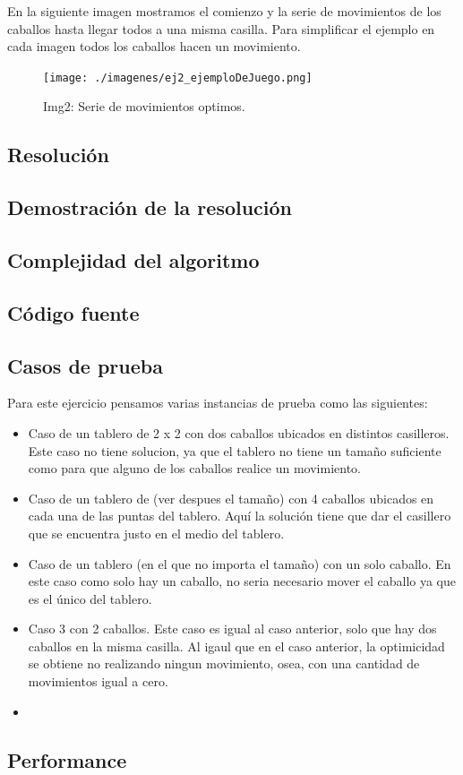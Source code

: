 En la siguiente imagen mostramos el comienzo y la serie de movimientos de los caballos hasta llegar todos a una misma casilla. Para simplificar el ejemplo en cada imagen todos los caballos hacen un movimiento.

\begin{figure}[H]
\begin{center}
\texttt{[image: ./imagenes/ej2\_ejemploDeJuego.png]}
\caption{Img2: Serie de movimientos optimos.}
\end{center}
\end{figure}


\subsection{Resoluci\'on}



\subsection{Demostraci\'on de la resoluci\'on}


\subsection{Complejidad del algoritmo}


\subsection{C\'odigo fuente}


\subsection{Casos de prueba}

Para este ejercicio pensamos varias instancias de prueba como las siguientes:

\begin{itemize}
\item Caso de un tablero de 2 x 2 con dos caballos ubicados en distintos casilleros. Este caso no tiene solucion, ya que el tablero no tiene un tamaño suficiente como para que alguno de los caballos realice un movimiento.
\item Caso de un tablero de (ver despues el tamaño) con 4 caballos ubicados en cada una de las puntas del tablero. Aquí la solución tiene que dar el casillero que se encuentra justo en el medio del tablero.
\item Caso de un tablero (en el que no importa el tamaño) con un solo caballo. En este caso como solo hay un caballo, no seria necesario mover el caballo ya que es el único del tablero.
\item Caso 3 con 2 caballos. Este caso es igual al caso anterior, solo que hay dos caballos en la misma casilla. Al igaul que en el caso anterior, la optimicidad se obtiene no realizando ningun movimiento, osea, con una cantidad de movimientos igual a cero.
\item
\end{itemize}

\subsection{Performance}


